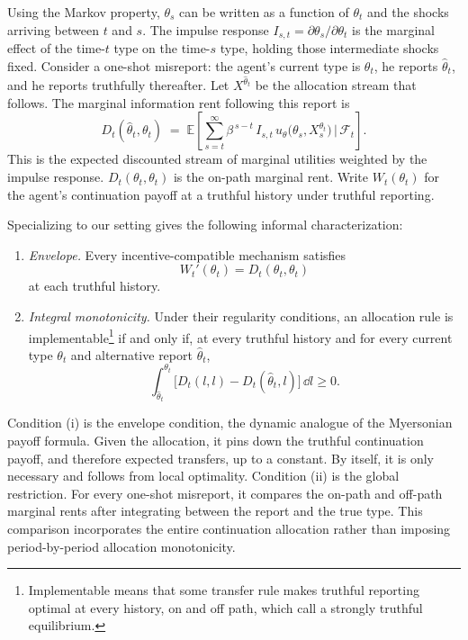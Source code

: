 \documentclass[12pt]{article}
\begin{document}
Using the Markov property, \(\theta_s\) can be
written as a function of \(\theta_t\) and the shocks
arriving between \(t\) and \(s\). The impulse response
\(I_{s,t}=\partial\theta_s/\partial\theta_t\) is the marginal effect
of the time-\(t\) type on the time-\(s\) type, holding those intermediate shocks
fixed. Consider a one-shot misreport: the agent's current type is
\(\theta_t\), he reports \(\hat\theta_t\), and he reports truthfully
thereafter. Let \(X^{\hat\theta_t}\) be the allocation stream that
follows. The marginal information rent following this report is
\begin{equation}\label{eq: marginal rent}
  D_t(\hat\theta_t,\theta_t)
  \;=\;
  \mathbb E\!\left[\sum_{s=t}^{\infty}\beta^{\,s-t}\,I_{s,t}\,
  u_\theta\bigl(\theta_s,X_s^{\hat\theta_t}\bigr)
  \,\Big|\,\mathcal F_t\right].
\end{equation}
This is the expected discounted stream of marginal utilities weighted
by the impulse response. \(D_t(\theta_t,\theta_t)\) is the on-path marginal rent.
Write \(W_t(\theta_t)\) for the agent's continuation payoff at a
truthful history under truthful reporting.

Specializing \citet[Theorems~1--3]{pavan2014dynamic} to our setting gives the following informal
characterization:
\begin{enumerate}
\item[(i)] \emph{Envelope.} Every incentive-compatible mechanism
satisfies
\[
  W_t'(\theta_t)=D_t(\theta_t,\theta_t)
\]
at each truthful history.

\item[(ii)] \emph{Integral monotonicity.} Under their regularity conditions, an allocation rule is implementable\footnote{Implementable means that some transfer rule
makes truthful reporting optimal at every history, on and off path,
which \citet{pavan2014dynamic} call a strongly truthful equilibrium.} if and only if,
at every truthful history and for every current type \(\theta_t\) and
alternative report \(\hat\theta_t\),
\begin{equation}\label{eq:pst-im}
  \int_{\hat\theta_t}^{\theta_t}
  \bigl[D_t(l,l)-D_t(\hat\theta_t,l)\bigr]\,\dd l
  \geq0.
\end{equation}
\end{enumerate}

Condition (i) is the envelope condition, the dynamic analogue of the
Myersonian payoff formula. Given the allocation, it pins down the
truthful continuation payoff, and therefore expected transfers, up to
a constant. By itself, it is only necessary and follows from local optimality. Condition (ii) is the
global restriction. For every one-shot misreport, it compares the
on-path and off-path marginal rents after integrating between the
report and the true type. This comparison incorporates the entire
continuation allocation rather than imposing period-by-period
allocation monotonicity.
\end{document}
